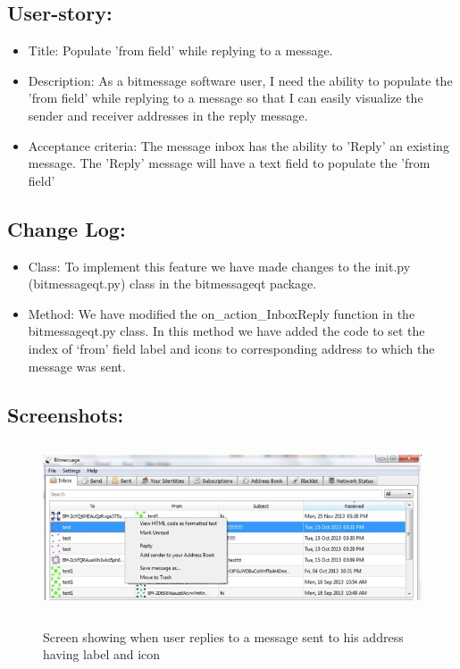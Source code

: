 \documentclass[12pt]{article}
\begin{document}
\subsection{User-story:}
\begin{itemize}
\item Title: Populate 'from field’ while replying to a message.

\item Description: As a bitmessage software user, I need the ability to populate the 'from field’ while replying to a message so that I can easily visualize the sender and receiver addresses in the reply message.

\item Acceptance criteria: The message inbox has the ability to 'Reply' an existing message. The 'Reply' message will have a text field to populate the 'from field’

\end{itemize}

\subsection{Change Log:}
\begin{itemize}
\item Class: To implement this feature we have made changes to the init.py (bitmessageqt.py) class in the bitmessageqt package. 
\item Method: We have modified the on\_action\_InboxReply function in the bitmessageqt.py class. In this method we have added the code to set the index of ‘from’ field label and icons to corresponding address to which the message was sent.
\end{itemize}

\subsection{Screenshots:}

\begin{figure}[H]
\begin{center}
    {\label{fig:1} \includegraphics[width=12cm,height=5cm]{F2_1.jpg}}   
  \centering  \caption{Screen showing when user replies to a message sent to his address having label and icon}
  \end{center}
\end{figure}
\end{document}
